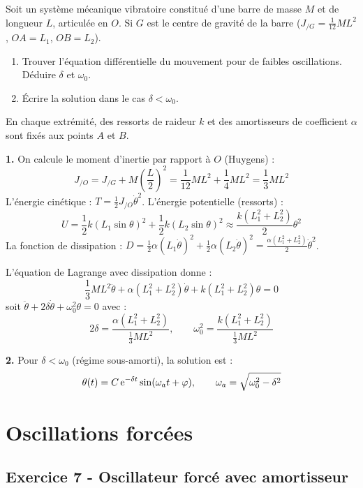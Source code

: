 \documentclass[12pt,a4paper]{article}
\begin{document}
\begin{boiteexercice}
Soit un système mécanique vibratoire constitué d'une barre de masse $M$ et de longueur $L$, articulée en $O$. Si $G$ est le centre de gravité de la barre ($J_{/G} = \frac{1}{12}ML^2$, $OA = L_1$, $OB = L_2$).
\begin{enumerate}
  \item Trouver l'équation différentielle du mouvement pour de faibles oscillations. Déduire $\delta$ et $\omega_0$.
  \item Écrire la solution dans le cas $\delta < \omega_0$.
\end{enumerate}
En chaque extrémité, des ressorts de raideur $k$ et des amortisseurs de coefficient $\alpha$ sont fixés aux points $A$ et $B$.
\end{boiteexercice}

\begin{boitecorrige}
\textbf{1.} On calcule le moment d'inertie par rapport à $O$ (Huygens) :
\[
J_{/O} = J_{/G} + M\!\left(\frac{L}{2}\right)^2 = \frac{1}{12}ML^2 + \frac{1}{4}ML^2 = \frac{1}{3}ML^2
\]
L'énergie cinétique : $T = \frac{1}{2}J_{/O}\dot\theta^2$. L'énergie potentielle (ressorts) :
\[
U = \frac{1}{2}k(L_1\sin\theta)^2 + \frac{1}{2}k(L_2\sin\theta)^2 \approx \frac{k(L_1^2+L_2^2)}{2}\theta^2
\]
La fonction de dissipation : $D = \frac{1}{2}\alpha(L_1\dot\theta)^2 + \frac{1}{2}\alpha(L_2\dot\theta)^2 = \frac{\alpha(L_1^2+L_2^2)}{2}\dot\theta^2$.

L'équation de Lagrange avec dissipation donne :
\[
\frac{1}{3}ML^2\ddot\theta + \alpha(L_1^2+L_2^2)\dot\theta + k(L_1^2+L_2^2)\theta = 0
\]
soit $\ddot\theta + 2\delta\dot\theta + \omega_0^2\theta = 0$ avec :
\[
2\delta = \frac{\alpha(L_1^2+L_2^2)}{\frac{1}{3}ML^2}, \qquad \omega_0^2 = \frac{k(L_1^2+L_2^2)}{\frac{1}{3}ML^2}
\]

\textbf{2.} Pour $\delta < \omega_0$ (régime sous-amorti), la solution est :
\[
\theta(t) = C\,\mathrm{e}^{-\delta t}\sin(\omega_a t + \varphi), \qquad \omega_a = \sqrt{\omega_0^2 - \delta^2}
\]
\end{boitecorrige}

\section{Oscillations forcées}

\subsection*{Exercice 7 - Oscillateur forcé avec amortisseur \niveau{\moyen}}
\end{document}
